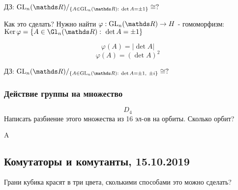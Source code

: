 \documentclass[12pt, fleqn]{article}
\begin{document}
\begin{example}
  ДЗ: $\GL_n(\R)/_{\{A \in \GL_n(\R):\ \det A = \pm 1 \}} \cong ?$

  Как это сделать? Нужно найти $\varphi: \GL_n(\R) \ra H$ - гомоморфизм: $\Ker \varphi = \{ A \in \Gl_n(\R):\ \det A = \pm 1\}$
\end{example}

\begin{Sol}
  \[\varphi(A)=|\det A|\]
  \[\varphi(A)=(\det A)^2\]
\end{Sol}

ДЗ: $\GL_n(\R)/_{\{A \in \GL_n(\R):\ \det A = \pm 1,\ \pm i \}} \cong ?$

\subsubsection{Действие группы на множество}

\begin{Example}
  \[D_4\]
  Написать разбиение этого множества из 16 эл-ов на орбиты. Сколько орбит?
\end{Example}

\begin{Sol}
  A
\end{Sol}

\subsection{Комутаторы и комутанты, 15.10.2019}

\begin{example}
  Грани кубика красят в три цвета, сколькими способами это можно сделать?
\end{example}
\end{document}
